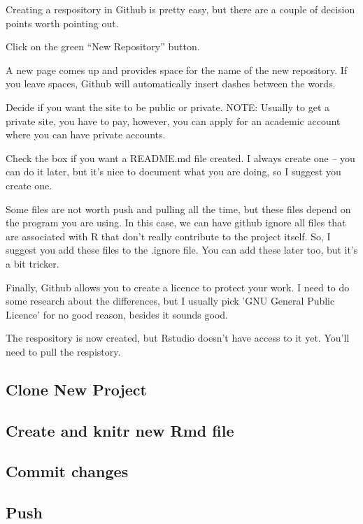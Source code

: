 \documentclass[12pt]{../SOP4_alpha}\usepackage[]{graphicx}\usepackage[]{color}
\begin{document}
\NP Creating a respository in Github is pretty easy, but there are a couple of decision points worth pointing out.

\NP Click on the green ``New Repository'' button.

\NP A new page comes up and provides space for the name of the new repository. If you leave spaces, Github will automatically insert dashes between the words.

\NP Decide if you want the site to be public or private. NOTE: Usually to get a private site, you have to pay, however, you can apply for an academic account where you can have private accounts. 

\NP Check the box if you want a README.md file created. I always create one -- you can do it later, but it's nice to document what you are doing, so I suggest you create one.

\NP Some files are not worth push and pulling all the time, but these files depend on the program you are using. In this case, we can have github ignore all files that are associated with R that don't really contribute to the project itself. So, I suggest you add these files to the .ignore file. You can add these later too, but it's a bit tricker.

\NP Finally, Github allows you to create a licence to protect your work. I need to do some research about the differences, but I usually pick 'GNU General Public Licence' for no good reason, besides it sounds good.

\NP The respository is now created, but Rstudio doesn't have access to it yet. You'll need to pull the respistory.

\subsection{Clone New Project}

\subsection{Create and knitr new Rmd file}

\subsection{Commit changes}

\subsection{Push}
\end{document}
